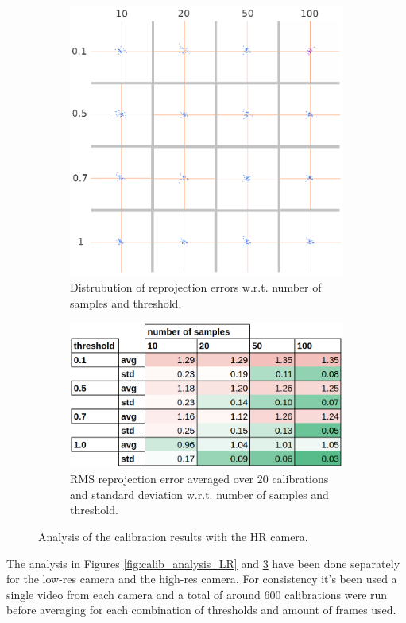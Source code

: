 \begin{figure}[H]
  \centering
  \begin{subfigure}{.5\textwidth}
    \centering
    \includegraphics[width=.8\linewidth]{figures/reprj_dist_HR.png}
    \caption{Distrubution of reprojection errors w.r.t. \newline number of samples and threshold.}
    \label{fig:reprj_dist_HR}
  \end{subfigure}%
  \begin{subfigure}{.5\textwidth}
    \centering
    \includegraphics[width=0.8\linewidth]{figures/calib_results_table_HR.png}
    \caption{RMS reprojection error averaged over 20 calibrations and standard deviation w.r.t. number of samples and threshold.}
    \label{fig:calib_stats_HR}
  \end{subfigure}
  \caption{Analysis of the calibration results with the HR camera.}
  \label{fig:calib_analysis_HR}
\end{figure}
The analysis in Figures \ref{fig:calib_analysis_LR} and \ref{fig:calib_analysis_HR} have been done separately for the low-res camera and the high-res camera. For consistency it's been used a single video from each camera and a total of around 600 calibrations were run before averaging for each combination of thresholds and amount of frames used.

